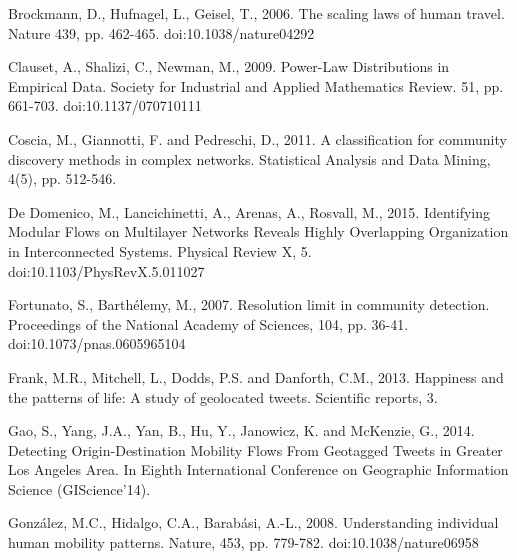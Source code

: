 \documentclass[]{tGIS2e}
\begin{document}


\begin{thebibliography}{9}

Brockmann, D., Hufnagel, L., Geisel, T., 2006. The scaling laws of human travel. Nature 439, pp. 462-465. doi:10.1038/nature04292

Clauset, A., Shalizi, C., Newman, M., 2009. Power-Law Distributions in Empirical Data. Society for Industrial and Applied Mathematics Review. 51, pp. 661-703. doi:10.1137/070710111

Coscia, M., Giannotti, F. and Pedreschi, D., 2011. A classification for community discovery methods in complex networks. Statistical Analysis and Data Mining, 4(5), pp. 512-546.

De Domenico, M., Lancichinetti, A., Arenas, A., Rosvall, M., 2015. Identifying Modular Flows on Multilayer Networks Reveals Highly Overlapping Organization in Interconnected Systems. Physical Review X, 5. doi:10.1103/PhysRevX.5.011027

Fortunato, S., Barthélemy, M., 2007. Resolution limit in community detection. Proceedings of the National Academy of Sciences, 104, pp. 36-41. doi:10.1073/pnas.0605965104

Frank, M.R., Mitchell, L., Dodds, P.S. and Danforth, C.M., 2013. Happiness and the patterns of life: A study of geolocated tweets. Scientific reports, 3.

Gao, S., Yang, J.A., Yan, B., Hu, Y., Janowicz, K. and McKenzie, G., 2014. Detecting Origin-Destination Mobility Flows From Geotagged Tweets in Greater Los Angeles Area. In Eighth International Conference on Geographic Information Science (GIScience'14).

González, M.C., Hidalgo, C.A., Barabási, A.-L., 2008. Understanding individual human mobility patterns. Nature, 453, pp. 779-782. doi:10.1038/nature06958


\end{thebibliography}
\end{document}
